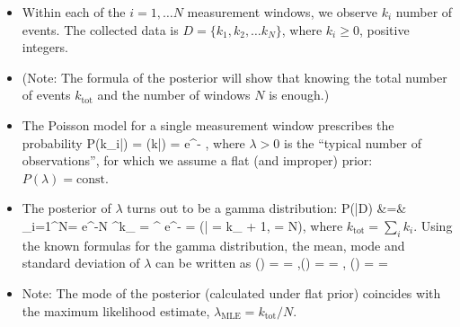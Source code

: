 \begin{itemize}
	\item Within each of the $i=1,\ldots N$ measurement windows, we observe $k_i$ number of events. The collected data is $D = \{k_1, k_2, \ldots k_N\}$, where $k_i \geq 0$, positive integers.
	\item (Note: The formula of the posterior will show that knowing the total number of events $k_\text{tot}$ and the number of windows $N$ is enough.)
	\item The Poisson model for a single measurement window prescribes the probability 
	\be
		P(k_i\;|\;\lambda) = (k\;|\;\lambda) = e^{-\lambda} ,
	\ee 
	where $\lambda > 0$ is the ``typical number of observations'', for which we assume a flat (and improper) prior: $P(\lambda) = \text{const.}$
	\item The posterior of $\lambda$ turns out to be a gamma distribution:
	\ba
		P(\lambda\;|\;D) 
		&=&  \prod_{i=1}^N =  e^{-N\lambda} \lambda^{k_\text{tot}}
		= \frac{\beta^\alpha}{\Gamma(\alpha)} \lambda^{} e^{-\beta\lambda} = (\lambda\;|\; \alpha = k_ + 1, \beta = N),
	\ea
	where $k_\text{tot} = \sum_i k_i$. Using the known formulas for the gamma distribution, the mean, mode and standard deviation of $\lambda$ can be written as
	\ba
		(\lambda) = \frac{\alpha}{\beta} = ,\quad {}(\lambda) =  = ,\quad
		(\lambda) = \frac{\sqrt{\alpha}}{\beta} = 
	\ea
	\item Note: The mode of the posterior (calculated under flat prior) coincides with the maximum likelihood estimate, $\lambda_\text{MLE} = k_\text{tot} / N$.
\end{itemize}
\vspace{0.5cm}

